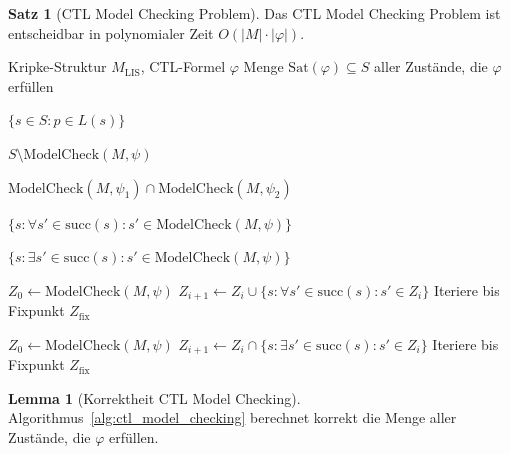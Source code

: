 \documentclass[a4paper,12pt]{article}
\theoremstyle{definition}
\newtheorem{satz}{Satz}
\newtheorem{lemma}{Lemma}
\begin{document}
	\begin{satz}[CTL Model Checking Problem]
		\label{satz:ctl_model_checking}
		Das CTL Model Checking Problem ist entscheidbar in polynomialer Zeit $O(|M| \cdot |\varphi|)$.
	\end{satz}
	
	\begin{algorithm}[H]
		\caption{CTL Model Checking (Fixed-Point Iteration)}
		\label{alg:ctl_model_checking}
		\begin{algorithmic}[1]
			\Require Kripke-Struktur $M_{\text{LIS}}$, CTL-Formel $\varphi$
			\Ensure Menge $\text{Sat}(\varphi) \subseteq S$ aller Zustände, die $\varphi$ erfüllen
			
			\Switch{$\varphi$}
			\State \Return $\{s \in S : p \in L(s)\}$
			\EndCase
			
			\Case{$\neg \psi$}
			\State \Return $S \setminus \text{ModelCheck}(M, \psi)$
			\EndCase
			
			\State \Return $\text{ModelCheck}(M, \psi_1) \cap \text{ModelCheck}(M, \psi_2)$
			\EndCase
			
			\State \Return $\{s : \forall s' \in \text{succ}(s): s' \in \text{ModelCheck}(M, \psi)\}$
			\EndCase
			
			\State \Return $\{s : \exists s' \in \text{succ}(s): s' \in \text{ModelCheck}(M, \psi)\}$
			\EndCase
			
			\State $Z_0 \leftarrow \text{ModelCheck}(M, \psi)$
			\State $Z_{i+1} \leftarrow Z_i \cup \{s : \forall s' \in \text{succ}(s): s' \in Z_i\}$
			\State Iteriere bis Fixpunkt
			\State \Return $Z_{\text{fix}}$
			\EndCase
			
			\State $Z_0 \leftarrow \text{ModelCheck}(M, \psi)$
			\State $Z_{i+1} \leftarrow Z_i \cap \{s : \exists s' \in \text{succ}(s): s' \in Z_i\}$
			\State Iteriere bis Fixpunkt
			\State \Return $Z_{\text{fix}}$
			\EndCase
			\EndSwitch
			\EndFunction
			\end{algorithmic}
	\end{algorithm}
	
	\begin{lemma}[Korrektheit CTL Model Checking]
		\label{lem:ctl_mc_korrektheit}
		Algorithmus~\ref{alg:ctl_model_checking} berechnet korrekt die Menge aller Zustände, die $\varphi$ erfüllen.
	\end{lemma}
	
\end{document}
